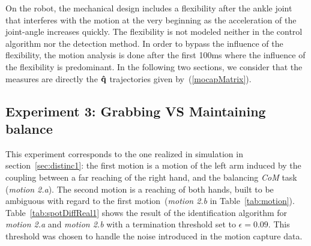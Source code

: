 \documentclass[journal]{IEEEtran}
\begin{document}
On the robot, the mechanical design includes a flexibility after the ankle joint that
interferes with the motion at the very beginning as the acceleration
of the joint-angle increases quickly. The flexibility is not modeled
neither in the control algorithm nor the detection method.
In order to bypass the influence of the flexibility, the motion analysis is done after the first 100ms
where the influence of the flexibility is predominant.
In the following two sections, we consider that the measures are directly the ${\mathbf{\hat{q}}}$ trajectories
given by~(\ref{mocapMatrix}).

\subsection{Experiment 3: Grabbing VS Maintaining balance}
This experiment corresponds to the one realized in simulation in section~\ref{sec:distinc1}:
the first motion is a motion of the left arm induced by the coupling between a far reaching of the right hand,
and the balancing \emph{CoM} task (\emph{motion 2.a}). The second motion is a reaching of both hands, built to be
ambiguous with regard to the first motion~(\emph{motion 2.b} in Table~\ref{tab:motion}).
Table~\ref{tab:spotDiffReal1} shows the result of the identification algorithm for
\emph{motion 2.a} and \emph{motion 2.b} with a termination threshold set to $ \epsilon = 0.09$.
This threshold was chosen to handle the noise introduced in the motion capture data.
\end{document}
